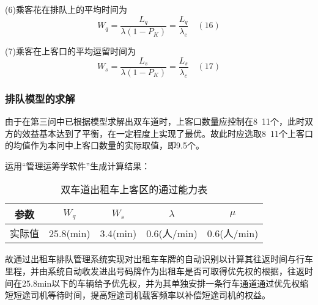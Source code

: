 \documentclass[withoutpreface,bwprint]{cumcmthesis} %
\begin{document}
(6)乘客花在排队上的平均时间为
$$
W_{q}=\frac{L_{q}}{\lambda\left(1-P_{K}\right)}=\frac{L_{q}}{\lambda_{e}}  \quad(16)
$$

(7)乘客在上客口的平均逗留时间为
$$
W_{s}=\frac{L_{s}}{\lambda\left(1-P_{K}\right)}=\frac{L_{s}}{\lambda_{c}}  \quad(17)
$$

\subsubsection{排队模型的求解}
由于在第三问中已根据模型求解出双车道时，上客口数量应控制在8~11个，此时双方的效益基本达到了平衡，在一定程度上实现了最优。故此时应选取8~11个上客口的均值作为本问中上客口数量的实际取值，即9.5个。

运用“管理运筹学软件”生成计算结果：
\begin{table}[!htbp]
	\caption{双车道出租车上客区的通过能力表}\label{tab:009} \centering
	\begin{tabular}{ccccc}
		\toprule[2pt]
		参数 & $W_q$ & $W_s$ & $\lambda$ & $\mu$\\
		\midrule[1pt]
		实际值 & 25.8(min) & 3.4(min) & 0.6(人/min) & 0.6(人/min)\\
		\bottomrule[1.5pt]
	\end{tabular}
\end{table}
故通过出租车排队管理系统实现对出租车车牌的自动识别以计算其往返时间与行车里程，并由系统自动收发进出号码牌作为出租车是否可取得优先权的根据，往返时间在25.8min以下的车辆给予优先权，并为其单独安排一条行车通道通过优先权缩短短途司机等待时间，提高短途司机载客频率以补偿短途司机的权益。
\newpage


\end{document}
